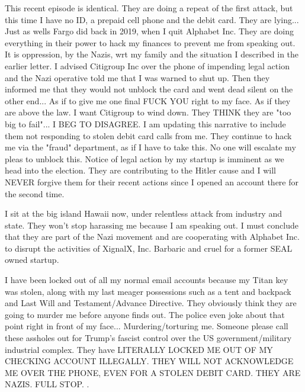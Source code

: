 \documentclass[a4paper]{arthur-letter}
\begin{document}
\begin{letter}
    This recent episode is identical. They are doing a repeat of the first attack, but this time I have no ID, a prepaid cell phone and the debit card. They are lying... Just as wells Fargo did back in 2019, when I quit Alphabet Inc. They are doing everything in their power to hack my finances to prevent me from speaking out. It is oppression, by the Nazis, wrt my family and the situation I described in the earlier letter. I advised Citigroup Inc over the phone of impending legal action and the Nazi operative told me that I was warned to shut up. Then they informed me that they would not unblock the card and went dead silent on the other end... As if to give me one final FUCK YOU right to my face. As if they are above the law. I want Citigroup to wind down. They THINK they are "too big to fail"... I BEG TO DISAGREE. I am updating this narrative to include them not responding to stolen debit card calls from me. They continue to hack me via the "fraud" department, as if I have to take this. No one will escalate my pleas to unblock this. Notice of legal action by my startup is imminent as we head into the election. They are contributing to the Hitler cause and I will NEVER forgive them for their recent actions since I opened an account there for the second time. 

    I sit at the big island Hawaii now, under relentless attack from industry and state. They won't stop harassing me because I am speaking out. I must conclude that they are part of the Nazi movement and are cooperating with Alphabet Inc. to disrupt the activities of XignalX, Inc. Barbaric and cruel for a former SEAL owned startup. 

    I have been locked out of all my normal email accounts because my Titan key was stolen, along with my last meager possessions such as a tent and backpack and Last Will and Testament/Advance Directive. They obviously think they are going to murder me before anyone finds out. The police even joke about that point right in front of my face... Murdering/torturing me. Someone please call these assholes out for Trump's fascist control over the US government/military industrial complex. They have LITERALLY LOCKED ME OUT OF MY CHECKING ACCOUNT ILLEGALLY. THEY WILL NOT ACKNOWLEDGE ME OVER THE PHONE, EVEN FOR A STOLEN DEBIT CARD. THEY ARE NAZIS. FULL STOP. \cite{targetcorporationhitlersalute} \cite{bigbangtheoryhouse5058pendleton} \cite{stripmalls}.
    

\end{letter}
\end{document}
